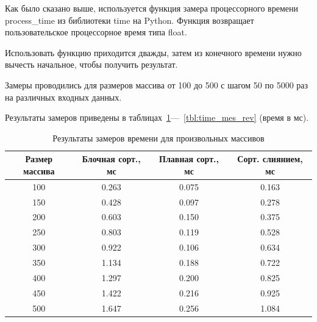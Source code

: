 Как было сказано выше, используется функция замера процессорного времени process\_time из библиотеки time на Python. Функция возвращает пользовательское процессорное время типа float.

Использовать функцию приходится дважды, затем из конечного времени нужно вычесть начальное, чтобы получить результат.

Замеры проводились для размеров массива от 100 до 500 с шагом 50 по 5000 раз на различных входных данных.

Результаты замеров приведены в таблицах~\ref{tbl:time_mes_rand}---~\ref{tbl:time_mes_rev} (время в мс).

\begin{table}[H]
	\begin{center}
		\begin{threeparttable}
			\captionsetup{justification=raggedright, singlelinecheck=off}
			\caption{Результаты замеров времени для произвольных массивов}
			\label{tbl:time_mes_rand}
			\begin{tabular}{|c|c|c|c|}
				\hline
				Размер массива & Блочная сорт., мс & Плавная сорт., мс & Сорт. слиянием, мс\\
				\hline
				100&0.263&0.075&0.163\\
				\hline
				150&0.428&0.097&0.278\\
				\hline
				200&0.603&0.150&0.375\\
				\hline
				250&0.803&0.119&0.528\\
				\hline
				300&0.922&0.106&0.634\\
				\hline
				350&1.134&0.188&0.722\\
				\hline
				400&1.297&0.200&0.825\\
				\hline
				450&1.422&0.216&0.925\\
				\hline
				500&1.647&0.256&1.084\\
				\hline
			\end{tabular}
		\end{threeparttable}
	\end{center}
\end{table}

